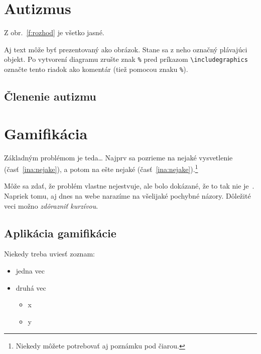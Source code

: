 \documentclass[10pt,twoside,slovak,a4paper]{coursepaper}
\begin{document}
\section{Autizmus} \label{Autizmus}

Z obr.~\ref{f:rozhod} je všetko jasné. 

\begin{figure*}[tbh]
\centering
Aj text môže byť prezentovaný ako obrázok. Stane sa z neho označný plávajúci objekt. Po vytvorení diagramu zrušte znak \texttt{\%} pred príkazom \verb|\includegraphics| označte tento riadok ako komentár (tiež pomocou znaku \texttt{\%}).
\caption{Rozhodujúci argument.}
\label{f:rozhod}
\end{figure*}

\subsection{Členenie autizmu}\label{Členenie autizmu}

\section{Gamifikácia} \label{Gamifikácia}

Základným problémom je teda\ldots{} Najprv sa pozrieme na nejaké vysvetlenie (časť~\ref{ina:nejake}), a potom na ešte nejaké (časť~\ref{ina:nejake}).\footnote{Niekedy môžete potrebovať aj poznámku pod čiarou.}

Môže sa zdať, že problém vlastne nejestvuje\cite{Coplien:MPD}, ale bolo dokázané, že to tak nie je~\cite{Czarnecki:Staged, Czarnecki:Progress}. Napriek tomu, aj dnes na webe narazíme na všelijaké pochybné názory\cite{PLP-Framework}. Dôležité veci možno \emph{zdôrazniť kurzívou}.


\subsection{Aplikácia gamifikácie} \label{Aplikácie gamifikácie}

Niekedy treba uviesť zoznam:

\begin{itemize}
\item jedna vec
\item druhá vec
	\begin{itemize}
	\item x
	\item y
	\end{itemize}
\end{itemize}
\end{document}
